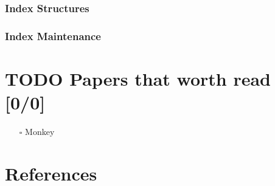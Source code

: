 \documentclass[11pt]{article}
\begin{document}
\subsubsection{Index Structures}
\label{sec:org59f1200}
\subsubsection{Index Maintenance}
\label{sec:org0cd6200}
\section{{\bfseries\sffamily TODO} Papers that worth read [0/0]}
\label{sec:orgbfd7d73}
\begin{itemize}
\item[{$\square$}] Monkey
\end{itemize}
\section{References}
\label{sec:org17833f1}
\label{bibliographystyle link}


\label{bibliography link}

\end{document}
